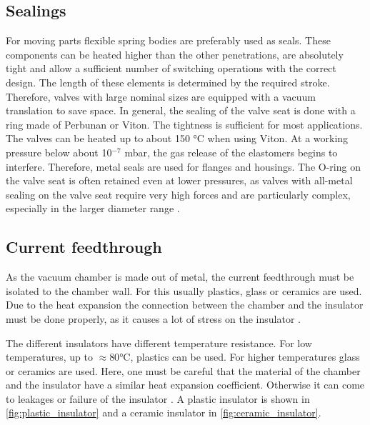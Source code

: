 \subsection{Sealings}
For moving parts flexible spring bodies are preferably used as seals.
These components can be heated higher than the other penetrations, are absolutely tight and allow a sufficient number of switching operations with the correct design.
The length of these elements is determined by the required stroke. Therefore, valves with large nominal sizes are equipped with a vacuum translation to save space.
In general, the sealing of the valve seat is done with a ring made of Perbunan or Viton.
The tightness is sufficient for most applications.
The valves can be heated up to about 150 °C when using Viton.
At a working pressure below about 10$^{-7}$ mbar, the gas release of the elastomers begins to interfere.
Therefore, metal seals are used for flanges and housings.
The O-ring on the valve seat is often retained even at lower pressures, as valves with all-metal sealing on the valve seat require very high forces and are particularly complex, especially in the larger diameter range \cite{Wutz2000}.

\subsection{Current feedthrough}

As the vacuum chamber is made out of metal, the current feedthrough must be isolated to the chamber wall.
For this usually plastics, glass or ceramics are used.
Due to the heat expansion the connection between the chamber and the insulator must be done properly, as it causes a lot of stress on the insulator \cite{Wutz2000}.

The different insulators have different temperature resistance.
For low temperatures, up to $\approx 80\si{\degreeCelsius}$, plastics can be used.
For higher temperatures glass or ceramics are used.
Here, one must be careful that the material of the chamber and the insulator have a similar heat expansion coefficient.
Otherwise it can come to leakages or failure of the insulator \cite{Wutz2000}.
A plastic insulator is shown in \autoref{fig:plastic_insulator} and a ceramic insulator in \autoref{fig:ceramic_insulator}.


